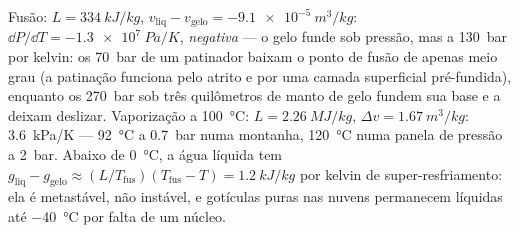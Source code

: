 \begin{example}\label{ex:b2:thermodynamic-potentials:water}
Fusão: $L = \qty{334}{kJ/kg}$, $v_{\text{liq}} - v_{\text{gelo}} = -\qty{9.1e-5}{m^3/kg}$:
$\dd P/\dd T = \qty{-1.3e7}{Pa/K}$, \emph{negativa} --- o gelo funde sob
pressão, mas a \qty{130}{bar} por kelvin: os \qty{70}{bar} de um patinador baixam
o ponto de fusão de apenas meio grau (a patinação funciona pelo atrito e por
uma camada superficial pré-fundida), enquanto os \qty{270}{bar} sob três
quilômetros de manto de gelo fundem sua base e a deixam deslizar. Vaporização a
\qty{100}{\celsius}: $L = \qty{2.26}{MJ/kg}$, $\Delta v = \qty{1.67}{m^3/kg}$:
\qty{3.6}{kPa/K} --- \qty{92}{\celsius} a \qty{0.7}{bar} numa montanha,
\qty{120}{\celsius} numa panela de pressão a \qty{2}{bar}. Abaixo de
\qty{0}{\celsius}, a água líquida tem $g_{\text{liq}} - g_{\text{gelo}} \approx
(L/T_{\text{fus}})(T_{\text{fus}} - T) = \qty{1.2}{kJ/kg}$ por kelvin de
super-resfriamento: ela é metastável, não instável, e gotículas puras nas
nuvens permanecem líquidas até \qty{-40}{\celsius} por falta de um núcleo.
\end{example}

